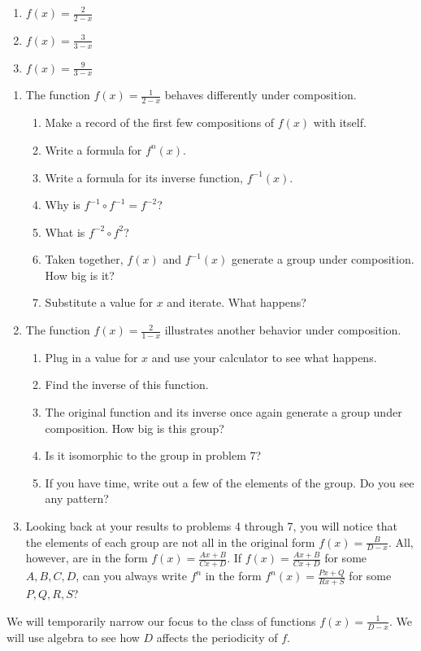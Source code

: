 \documentclass[../gatm.tex]{subfiles}
\begin{document}
\begin{multicols}{3}
\begin{enumerate}
\setcounter{enumi}{\value{problem_i}}
\item \label{prob:compose_start}$f(x)=\frac{2}{2-x}$
\item $f(x)=\frac{3}{3-x}$
\item \label{prob:compose_end}$f(x)=\frac{9}{3-x}$
\setcounter{problem_i}{\value{enumi}}
\end{enumerate}
\end{multicols}
\begin{enumerate}
\setcounter{enumi}{\value{problem_i}}
\item The function $f(x)=\frac{1}{2-x}$ behaves differently under composition.
\begin{enumerate}
\item Make a record of the first few compositions of $f(x)$ with itself.
\item Write a formula for $f^n(x)$.
\item Write a formula for its inverse function, $f^{-1}(x)$.
\item Why is $f^{-1}\circ f^{-1}=f^{-2}$?
\item What is $f^{-2}\circ f^2$?
\item Taken together, $f(x)$ and $f^{-1}(x)$ generate a group under composition. How big is it?
\item Substitute a value for $x$ and iterate. What happens?
\end{enumerate}
\item The function $f(x)=\frac{2}{1-x}$ illustrates another behavior under composition.
\begin{enumerate}
\item Plug in a value for $x$ and use your calculator to see what happens.
\item Find the inverse of this function.
\item The original function and its inverse once again generate a group under composition. How big is this group?
\item Is it isomorphic to the group in problem 7?
\item If you have time, write out a few of the elements of the group. Do you see any pattern?
\end{enumerate}
\item Looking back at your results to problems 4 through 7, you will notice that the elements of each group are not all in the original form $f(x)=\frac{B}{D-x}$. All, however, are in the form $f(x)=\frac{Ax+B}{Cx+D}$. If $f(x)=\frac{Ax+B}{Cx+D}$ for some $A,B,C,D$, can you always write $f^n$ in the form $f^n(x)=\frac{Px+Q}{Rx+S}$ for some $P,Q,R,S$?
\setcounter{problem_i}{\value{enumi}}
\end{enumerate}
We will temporarily narrow our focus to the class of functions $f(x)=\frac{1}{D-x}$. We will use algebra to see how $D$ affects the periodicity of $f$.
\end{document}
